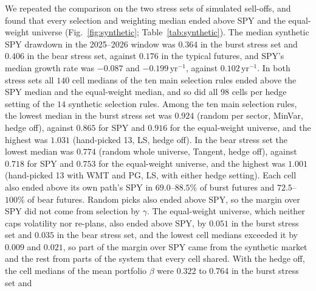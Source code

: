 We repeated the comparison on the two stress sets of simulated sell-offs, and found that every selection and
weighting median ended above SPY and the equal-weight universe (Fig.~\ref{fig:synthetic};
Table~\ref{tab:synthetic}). The median synthetic SPY drawdown in the 2025--2026 window was $0.364$ in the burst
stress set and $0.406$ in the bear stress set, against $0.176$ in the typical futures, and SPY's median growth rate
was $-0.087$ and $-0.199\,\mathrm{yr}^{-1}$, against $0.102\,\mathrm{yr}^{-1}$.
In both stress sets all $140$ cell medians of the ten main selection rules ended above the SPY median and the
equal-weight median, and so did all $98$ cells per hedge setting of the $14$ synthetic selection rules. Among the
ten main selection rules, the lowest median in the burst stress set was $0.924$ (random per sector, MinVar, hedge off), against $0.865$ for SPY and $0.916$
for the equal-weight universe, and the highest was $1.031$ (hand-picked 13, LS, hedge off). In the bear stress set
the lowest median was $0.774$ (random whole universe, Tangent, hedge off), against $0.718$ for SPY and $0.753$ for
the equal-weight universe, and the highest was $1.001$ (hand-picked 13 with WMT and PG, LS, with either hedge
setting).
Each cell also ended above its own path's SPY in $69.0$--$88.5\%$ of burst futures and $72.5$--$100\%$ of bear
futures. Random picks also ended above SPY, so the margin over SPY did not come from selection by $\gamma$.
The equal-weight universe, which neither caps volatility nor re-plans, also ended above SPY, by $0.051$ in the burst
stress set and $0.035$ in the bear stress set, and the lowest cell medians exceeded it by $0.009$ and $0.021$, so part
of the margin over SPY came from the synthetic market and the rest from parts of the system that every cell shared.
With the hedge off, the cell medians of the mean portfolio $\beta$ were $0.322$ to $0.764$ in the burst stress set and
